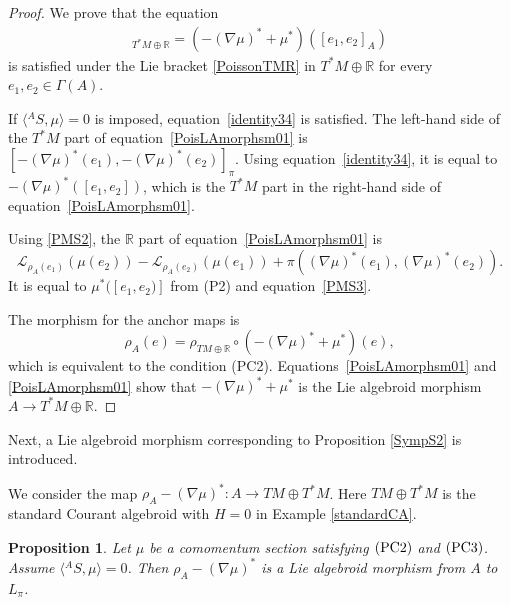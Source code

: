 \documentclass[pdftex]{sigma}
\numberwithin{equation}{section}
\newtheorem{Proposition}[Theorem]{Proposition}
 { \theoremstyle{definition}
\newtheorem{Definition}[Theorem]{Definition}
\newtheorem{Note}[Theorem]{Note}
\newtheorem{Example}[Theorem]{Example}
\newtheorem{Remark}[Theorem]{Remark}
\newtheorem{Question}[Theorem]{Question}
 }
\def\bR{{\mathbb{R}}}
\newcommand{\calL}{{\mathcal L}}
\newcommand{\rhoa}{{\rho_A}}
\newcommand{\rhotr}{\rho_{TM \oplus \bR}}
\begin{document}
\begin{proof}
We prove that the equation
\begin{gather}
[(-(\nabla \mu)^* + \mu^*)(e_1), (-(\nabla \mu)^* + \mu^*)(e_2)]_{T^*M \oplus \bR} =
(-(\nabla \mu)^* + \mu^*)([e_1, e_2]_A)
\label{PoisLAmorphsm01}
\end{gather}
is satisfied under the Lie bracket \eqref{PoissonTMR} in $T^*M \oplus \bR$
for every $e_1, e_2 \in \Gamma(A)$.

If $\bigl\langle {}^A S,\mu\bigr\rangle = 0$ is imposed, equation~\eqref{identity34} is satisfied.
The left-hand side of the $T^*M$ part of equation~\eqref{PoisLAmorphsm01} is
$
 [-(\nabla \mu)^*(e_1), -(\nabla \mu)^*(e_2)]_{\pi}
$.
Using equation~\eqref{identity34}, it is equal to
$-(\nabla \mu)^*([e_1, e_2])$, which is the $T^*M$ part in the right-hand side of equation~\eqref{PoisLAmorphsm01}.

Using \eqref{PMS2}, the $\bR$ part of equation~\eqref{PoisLAmorphsm01} is
\[
\calL_{\rhoa(e_1)} (\mu(e_2)) - \calL_{\rhoa(e_2)} (\mu(e_1))
+ \pi((\nabla \mu)^*(e_1), (\nabla \mu)^*(e_2)).
\]
It is equal to $\mu^*([e_1, e_2)]$ from (P2) and equation~\eqref{PMS3}.

The morphism for the anchor maps is
\[%
\rhoa(e) = \rhotr \circ (-(\nabla \mu)^* + \mu^*)(e),
\]
which is equivalent to the condition (PC2).
Equations~\eqref{PoisLAmorphsm01} and \eqref{PoisLAmorphsm01} show that
$-(\nabla \mu)^* + \mu^*$ is the Lie algebroid morphism
$A \rightarrow T^*M \oplus \bR$.
\end{proof}

Next, a Lie algebroid morphism
corresponding to Proposition \ref{SympS2} is introduced.

We consider the map $\rhoa - (\nabla \mu)^*\colon A \rightarrow TM \oplus T^*M$.
Here $TM \oplus T^*M$ is the standard Courant algebroid
with $H=0$ in Example \ref{standardCA}.

\begin{Proposition}\label{PoisP2}
Let $\mu$ be a comomentum section satisfying $\rm (PC2)$ and $\rm (PC3)$.
Assume $\bigl\langle {}^A S,\mu\bigr\rangle = 0$.
Then $\rhoa - (\nabla \mu)^*$ is a Lie algebroid morphism
from $A$ to $L_{\pi}$.
\end{Proposition}
\end{document}
